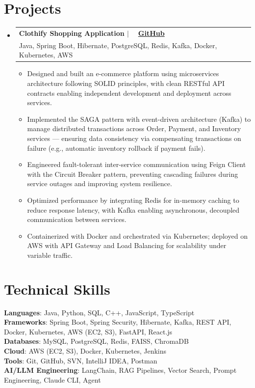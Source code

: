 \documentclass[11pt, letterpaper]{article}
\makeatletter
\newcommand{\resumeItem}[1]{
  \item\small{#1}
}
\newcommand{\resumeProjectHeading}[4]{
  \needspace{6cm}
  \vspace{-2pt}\item
    \begin{tabular*}{1.0\textwidth}[t]{@{}l@{\extracolsep{\fill}}r@{}}
      \textbf{\large #1} & \small #2 \\
      \small #3 & \textit{\small #4} \\
    \end{tabular*}\vspace{-7pt}
}
\newcommand{\resumeSubHeadingListStart}{\begin{itemize}[leftmargin=0.0in, label={}]}
\newcommand{\resumeSubHeadingListEnd}{\end{itemize}}
\newcommand{\resumeItemListStart}{\begin{itemize}[leftmargin=0.5cm, itemsep=0pt, parsep=0pt, topsep=2pt]\interlinepenalty=10000}
\newcommand{\resumeItemListEnd}{\end{itemize}\vspace{-2pt}}
\makeatother
\begin{document}
\section{Projects}
\resumeSubHeadingListStart
  \resumeProjectHeading{Clothify Shopping Application $|$  ~ \href{https://github.com/Enterprise-Work/Sangam-Enterprise}{GitHub}}{}{Java, Spring Boot, Hibernate, PostgreSQL, Redis, Kafka, Docker, Kubernetes, AWS}{}
    \resumeItemListStart
      \resumeItem{Designed and built an e-commerce platform using microservices architecture following SOLID principles, with clean RESTful API contracts enabling independent development and deployment across services.}
      \resumeItem{Implemented the SAGA pattern with event-driven architecture (Kafka) to manage distributed transactions across Order, Payment, and Inventory services — ensuring data consistency via compensating transactions on failure (e.g., automatic inventory rollback if payment fails).}
      \resumeItem{Engineered fault-tolerant inter-service communication using Feign Client with the Circuit Breaker pattern, preventing cascading failures during service outages and improving system resilience.}
      \resumeItem{Optimized performance by integrating Redis for in-memory caching to reduce response latency, with Kafka enabling asynchronous, decoupled communication between services.}
      \resumeItem{Containerized with Docker and orchestrated via Kubernetes; deployed on AWS with API Gateway and Load Balancing for scalability under variable traffic.}
    \resumeItemListEnd
\resumeSubHeadingListEnd


\section{Technical Skills}
\begin{itemize}[leftmargin=0.0in, label={}]
  \small{\item{
    \textbf{\large Languages}{: Java, Python, SQL, C++, JavaScript, TypeScript} \\[3pt]
    \textbf{\large Frameworks}{: Spring Boot, Spring Security, Hibernate, Kafka, REST API, Docker, Kubernetes, AWS (EC2, S3), FastAPI, React.js} \\[3pt]
    \textbf{\large Databases}{: MySQL, PostgreSQL, Redis, FAISS, ChromaDB} \\[3pt]
    \textbf{\large Cloud}{: AWS (EC2, S3), Docker, Kubernetes, Jenkins} \\[3pt]
    \textbf{\large Tools}{: Git, GitHub, SVN, IntelliJ IDEA, Postman} \\[3pt]
    \textbf{\large AI/LLM Engineering}{: LangChain, RAG Pipelines, Vector Search, Prompt Engineering, Claude CLI, Agent} \\[3pt]
  }}
\end{itemize}
\end{document}
